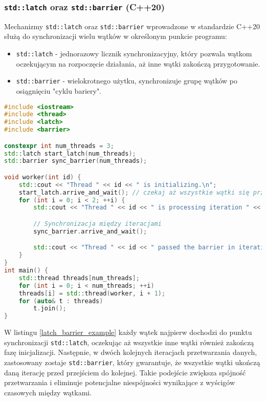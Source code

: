 \subsubsection{\texttt{std::latch} oraz \texttt{std::barrier} (C++20)}
Mechanizmy \texttt{std::latch} oraz \texttt{std::barrier} wprowadzone w standardzie C++20 służą do synchronizacji wielu wątków w określonym punkcie programu:
\begin{itemize}
    \item \texttt{std::latch} - jednorazowy licznik synchronizacyjny, który pozwala wątkom oczekującym na rozpoczęcie działania, aż inne wątki zakończą przygotowanie.
    \item \texttt{std::barrier} - wielokrotnego użytku, synchronizuje grupę wątków po osiągnięciu "cyklu bariery".
\end{itemize}
\begin{lstlisting}[language=C++, style=VS2017,  caption={Przykład użycia std::latch oraz std::barrier}, label={latch_barrier_example}]
#include <iostream>
#include <thread>
#include <latch>
#include <barrier>

constexpr int num_threads = 3;
std::latch start_latch(num_threads);
std::barrier sync_barrier(num_threads);

void worker(int id) {
    std::cout << "Thread " << id << " is initializing.\n";
    start_latch.arrive_and_wait(); // czekaj aż wszystkie wątki się przygotują
    for (int i = 0; i < 2; ++i) {
        std::cout << "Thread " << id << " is processing iteration " << i << ".\n";

        // Synchronizacja między iteracjami
        sync_barrier.arrive_and_wait();

        std::cout << "Thread " << id << " passed the barrier in iteration " << i << ".\n";
    }
}
int main() {
    std::thread threads[num_threads];
    for (int i = 0; i < num_threads; ++i)
    threads[i] = std::thread(worker, i + 1);
    for (auto& t : threads)
        t.join();
}
\end{lstlisting}    
W listingu \ref{latch_barrier_example} każdy wątek najpierw dochodzi do punktu synchronizacji \texttt{std::latch}, oczekując aż wszystkie inne wątki również zakończą fazę inicjalizacji. Następnie, w dwóch kolejnych iteracjach przetwarzania danych, zastosowany zostaje \texttt{std::barrier}, który gwarantuje, że wszystkie wątki ukończą daną iterację przed przejściem do kolejnej. Takie podejście zwiększa spójność przetwarzania i eliminuje potencjalne niespójności wynikające z wyścigów czasowych między wątkami.

